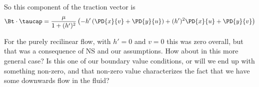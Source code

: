 So this component of the traction vector is
\begin{equation}\label{eqn:inclinedFlowWithoutConstantHeightAssumption:240}
\Bt \cdot \taucap 
=
\frac{\mu}{1 + (h')^2}
\left(
- h' 
\left( 
\PD{x}{v} +
\PD{y}{u}
\right)
+ (h')^2 \PD{x}{u} 
 + \PD{y}{v} 
\right)
\end{equation}

For the purely recilinear flow, with $h' = 0$ and $v = 0$ this was zero overall, but that was a consequence of NS and our assumptions.  How about in this more general case?  Is this one of our boundary value conditions, or will we end up with something non-zero, and that non-zero value characterizes the fact that we have some downwards flow in the fluid?

\EndNoBibArticle
